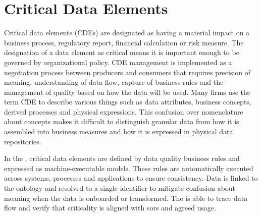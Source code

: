 \section{Critical Data Elements}\label{sec:ekgmm-b-4-5} %

Critical data elements (CDEs) are designated as having a material impact on a business process, regulatory report,
financial calculation or risk measure.
The designation of a data element as critical means it is important enough to be governed by organizational policy.
CDE management is implemented as a negotiation process between producers and consumers that requires
precision of meaning, understanding of data flow, capture of business rules and the management of quality based on
how the data will be used.
Many firms use the term CDE to describe various things such as data attributes, business concepts, derived processes
and physical expressions.
This confusion over nomenclature about concepts makes it difficult to distinguish granular data from how it is
assembled into business measures and how it is expressed in physical data repositories.

\kgmmekgrationalesection

In the ,
critical data elements are defined by data quality business rules and expressed as
machine-executable models.
These rules are automatically executed across systems, processes and applications to ensure consistency.
Data is linked to the ontology and resolved to a single identifier to mitigate confusion about meaning when the
data is onboarded or transformed.
The  is able to trace data flow and verify that criticality is aligned with \glspl{sor}
and agreed usage.

\kgmmcorequestionssection

